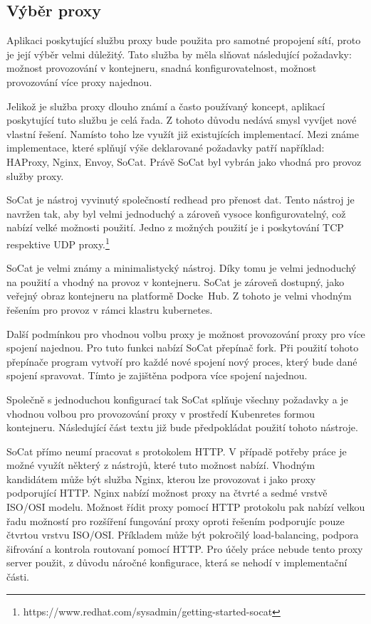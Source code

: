 \subsection{Výběr proxy}
Aplikaci poskytující službu proxy bude použita pro samotné propojení sítí, proto je její výběr velmi důležitý. Tato služba by měla slňovat následující požadavky: možnost provozování v kontejneru, snadná konfigurovatelnost, možnost provozování více proxy najednou.

Jelikož je služba proxy dlouho známí a často používaný koncept, aplikací poskytující tuto službu je celá řada. Z tohoto důvodu nedává smysl vyvíjet nové vlastní řešení. Namísto toho lze využít již existujících implementací. Mezi známe implementace, které splňují výše deklarované požadavky patří například: HAProxy, Nginx, Envoy, SoCat. Právě SoCat byl vybrán jako vhodná pro provoz služby proxy.

SoCat je nástroj vyvinutý společností redhead pro přenost dat. Tento nástroj je navržen tak, aby byl velmi jednoduchý a zároveň vysoce konfigurovatelný, což nabízí velké možnosti použití. Jedno z možných použití je i poskytování TCP respektive UDP proxy.\footnote{https://www.redhat.com/sysadmin/getting-started-socat}

SoCat je velmi známy a minimalistycký nástroj. Díky tomu je velmi jednoduchý na použití a vhodný na provoz v kontejneru. SoCat je zároveň dostupný, jako veřejný obraz kontejneru na platformě Docke~Hub. Z tohoto je velmi vhodným řešením pro provoz v rámci klastru kubernetes.

Další podmínkou pro vhodnou volbu proxy je možnost provozování proxy pro více spojení najednou. Pro tuto funkci nabízí SoCat přepínač fork. Při použití tohoto přepínače program vytvoří pro každé nové spojení nový proces, který bude dané spojení spravovat. Tímto je zajištěna podpora více spojení najednou.

Společně s jednoduchou konfigurací tak SoCat splňuje všechny požadavky a je vhodnou volbou pro provozování proxy v prostředí Kubenretes formou kontejneru. Následující část textu již bude předpokládat použití tohoto nástroje. 

\bigskip

SoCat přímo neumí pracovat s protokolem HTTP. V případě potřeby práce je možné využít některý z nástrojů, které tuto možnost nabízí. Vhodným kandidátem může být služba Nginx, kterou lze provozovat i jako proxy podporující HTTP. Nginx nabízí možnost proxy na čtvrté a sedmé vrstvě ISO/OSI modelu. Možnost řídit proxy pomocí HTTP protokolu pak nabízí velkou řadu možností pro rozšíření fungování proxy oproti řešením podporujíc pouze čtvrtou vrstvu ISO/OSI. Příkladem může být pokročilý load-balancing, podpora šifrování a kontrola routovaní pomocí HTTP. Pro účely práce nebude tento proxy server použit, z důvodu náročné konfigurace, která se nehodí v implementační části.      


